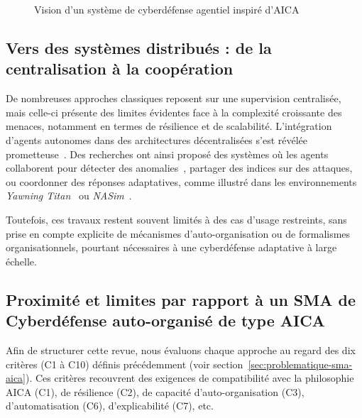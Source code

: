 \documentclass[ twoside,openright,titlepage,numbers=noenddot,headinclude,%
                footinclude=true,cleardoublepage=empty,abstractoff, %
                BCOR=5mm,paper=a4,fontsize=11pt,%
                french,american,%
                ]{scrreprt}
\begin{document}
\begin{figure}[H]
    \centering
    \caption{Vision d'un système de cyberdéfense agentiel inspiré d'AICA}
    \label{fig:agent_architecture}
\end{figure}

\subsection*{Vers des systèmes distribués : de la centralisation à la coopération}

De nombreuses approches classiques reposent sur une supervision centralisée, mais celle-ci présente des limites évidentes face à la complexité croissante des menaces, notamment en termes de résilience et de scalabilité. L'intégration d'agents autonomes dans des architectures décentralisées s'est révélée prometteuse~\cite{Sommer2010, Buczak2016}. Des recherches ont ainsi proposé des systèmes où les agents collaborent pour détecter des anomalies~\cite{Zhang2020, Nguyen2021}, partager des indices sur des attaques, ou coordonner des réponses adaptatives, comme illustré dans les environnements \emph{Yawning Titan}~\cite{Kroese2021} ou \emph{NASim}~\cite{Shetty2021}.

Toutefois, ces travaux restent souvent limités à des cas d'usage restreints, sans prise en compte explicite de mécanismes d'auto-organisation ou de formalismes organisationnels, pourtant nécessaires à une cyberdéfense adaptative à large échelle.

\subsection*{Proximité et limites par rapport à un SMA de Cyberdéfense auto-organisé de type AICA}

Afin de structurer cette revue, nous évaluons chaque approche au regard des dix critères (C1 à C10) définis précédemment (voir section~\ref{sec:problematique-sma-aica}). Ces critères recouvrent des exigences de compatibilité avec la philosophie AICA (C1), de résilience (C2), de capacité d'auto-organisation (C3), d'automatisation (C6), d'explicabilité (C7), etc.
\end{document}
